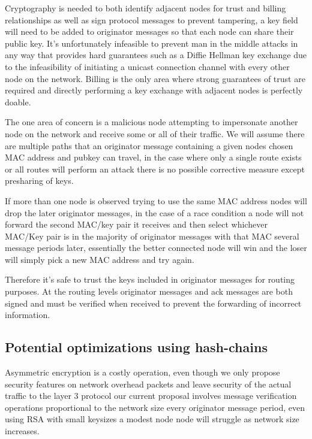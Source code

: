 \documentclass[11pt]{article}
\begin{document}
               Cryptography is needed to both identify adjacent nodes for trust and billing relationships as well as sign protocol messages to prevent tampering, a key field will need to be added to originator messages so that each node can share their public key. It's unfortunately infeasible to prevent man in the middle attacks in any way that provides hard guarantees such as a Diffie Hellman key exchange due to the infeasibility of initiating a unicast connection channel with every other node on the network. Billing is the only area where strong guarantees of trust are required and directly performing a key exchange with adjacent nodes is perfectly doable.
               
               The one area of concern is a malicious node attempting to impersonate another node on the network and receive some or all of their traffic. We will assume there are multiple paths that an originator message containing a given nodes chosen MAC address and pubkey can travel, in the case where only a single route exists or all routes will perform an attack there is no possible corrective measure except presharing of keys. 
               
               If more than one node is observed trying to use the same MAC address nodes will drop the later originator messages, in the case of a race condition a node will not forward the second MAC/key pair it receives and then select whichever MAC/Key pair is in the majority of originator messages with that MAC several message periods later, essentially the better connected node will win and the loser will simply pick a new MAC address and try again.
               
               Therefore it's safe to trust the keys included in originator messages for routing purposes. At the routing levels originator messages and ack messages are both signed and must be verified when received to prevent the forwarding of incorrect information.  
                   
    \subsection{Potential optimizations using hash-chains} \label{crypto}
    
               Asymmetric encryption is a costly operation, even though we only propose security features on network overhead packets and leave security of the actual traffic to the layer 3 protocol our current proposal involves message verification operations proportional to the network size every originator message period, even using RSA with small keysizes a modest node node will struggle as network size increases.
               
\end{document}
